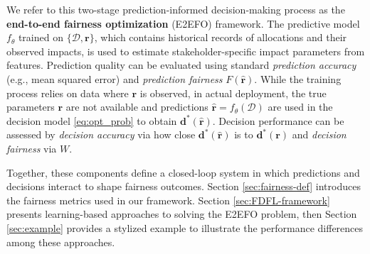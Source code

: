 \documentclass[ijoc,sglanonrev]{informs4}
\begin{document}
We refer to this two-stage prediction-informed decision-making process as the \textbf{end-to-end fairness optimization} (E2EFO) framework. The predictive model $f_{\theta}$ trained on $\{\mathcal{D},\mathbf{r}\}$, which contains historical records of allocations and their observed impacts, is used to estimate stakeholder-specific impact parameters from features. 
Prediction quality can be evaluated using standard \textit{prediction accuracy} (e.g., mean squared error) and \textit{prediction fairness} $F(\hat{\mathbf{r}})$.
While the training process relies on data where $\mathbf{r}$ is observed, in actual deployment, the true parameters $\mathbf{r}$ are not available and predictions $\hat{\mathbf{r}} = f_\theta(\mathcal{D})$ are used in the decision model \eqref{eq:opt_prob} to obtain $\mathbf{d^*}(\hat{\mathbf{r}})$. 
Decision performance can be assessed by \textit{decision accuracy} via how close $\mathbf{d^*}(\hat{\mathbf{r}})$ is to $\mathbf{d^*}(\mathbf{r})$ and \textit{decision fairness} via $W$. 

Together, these components define a closed-loop system in which predictions and decisions interact to shape fairness outcomes. Section \ref{sec:fairness-def} introduces the fairness metrics used in our framework. Section \ref{sec:FDFL-framework} presents learning-based approaches to solving the E2EFO problem, then Section \ref{sec:example} provides a stylized example to illustrate the performance differences among these approaches. 
\end{document}
